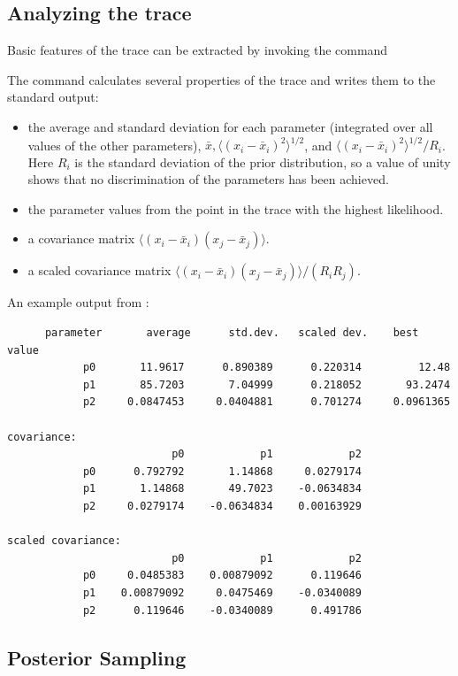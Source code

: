 \subsection{Analyzing the trace}\label{subsec:AnalyzingTheTrace}

Basic features of the trace can be extracted by invoking the command


The command calculates several properties of the trace and writes them to the standard output:
\begin{itemize}\itemsep=0pt
\item the average and standard deviation for each parameter (integrated over all values of the other parameters), $\bar{x},\langle(x_i-\bar{x}_i)^2\rangle^{1/2}$, and $\langle(x_i-\bar{x}_i)^2\rangle^{1/2}/R_i$.
Here $R_i$ is the standard deviation of the prior distribution, so a value of unity shows that no discrimination of the parameters has been achieved.
\item the parameter values from the point in the trace with the highest likelihood.
\item a covariance matrix $\langle (x_i-\bar{x}_i)(x_j-\bar{x}_j)\rangle$.
\item a scaled covariance matrix $\langle (x_i-\bar{x}_i)(x_j-\bar{x}_j)\rangle/(R_iR_j)$.
\end{itemize}

An example output from :
\begin{verbatim}
      parameter       average      std.dev.   scaled dev.    best value
            p0       11.9617      0.890389      0.220314         12.48
            p1       85.7203       7.04999      0.218052       93.2474
            p2     0.0847453     0.0404881      0.701274     0.0961365

covariance:
                          p0            p1            p2
            p0      0.792792       1.14868     0.0279174
            p1       1.14868       49.7023    -0.0634834
            p2     0.0279174    -0.0634834    0.00163929

scaled covariance:
                          p0            p1            p2
            p0     0.0485383    0.00879092      0.119646
            p1    0.00879092     0.0475469    -0.0340089
            p2      0.119646    -0.0340089      0.491786
\end{verbatim}

 \subsection{Posterior Sampling}\label{subsec:PosteriorSampling}

